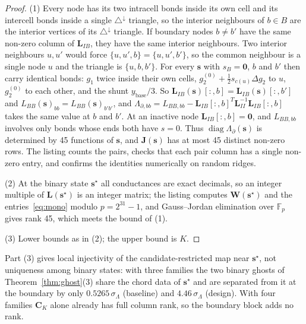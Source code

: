 \documentclass[11pt,a4paper]{article}
\theoremstyle{definition}
\theoremstyle{remark}
\begin{document}
\begin{proof}
(1) Every node has its two intracell bonds inside its own cell and its intercell bonds inside a single $\triangle^{\downarrow}$ triangle, so the interior neighbours of $b\in B$ are the interior vertices of its $\triangle^{\downarrow}$ triangle. If boundary nodes $b\neq b'$ have the same non-zero column of $\mathbf{L}_{IB}$, they have the same interior neighbours. Two interior neighbours $u,u'$ would force $\{u,u',b\} = \{u,u',b'\}$, so the common neighbour is a single node $u$ and the triangle is $\{u,b,b'\}$. For every $\mathbf{s}$ with $s_B = \mathbf{0}$, $b$ and $b'$ then carry identical bonds: $g_1$ twice inside their own cells, $g_2^{(0)}+\tfrac12 s_{c(u)}\Delta g_2$ to $u$, $g_2^{(0)}$ to each other, and the shunt $y_{\text{base}}/3$. So $\mathbf{L}_{IB}(\mathbf{s})[:,b] = \mathbf{L}_{IB}(\mathbf{s})[:,b']$ and $L_{BB}(\mathbf{s})_{bb} = L_{BB}(\mathbf{s})_{b'b'}$, and $\Lambda_{\partial,bb} = L_{BB,bb} - \mathbf{L}_{IB}[:,b]^T\mathbf{L}_{II}^{-1}\mathbf{L}_{IB}[:,b]$ takes the same value at $b$ and $b'$. At an inactive node $\mathbf{L}_{IB}[:,b] = \mathbf{0}$, and $L_{BB,bb}$ involves only bonds whose ends both have $s = 0$. Thus $\operatorname{diag}\Lambda_\partial(\mathbf{s})$ is determined by 45 functions of $\mathbf{s}$, and $\mathbf{J}(\mathbf{s})$ has at most 45 distinct non-zero rows. The listing counts the pairs, checks that each pair column has a single non-zero entry, and confirms the identities numerically on random ridges.

(2) At the binary state $\mathbf{s}^\star$ all conductances are exact decimals, so an integer multiple of $\mathbf{L}(\mathbf{s}^\star)$ is an integer matrix; the listing computes $\mathbf{W}(\mathbf{s}^\star)$ and the entries~\eqref{eq:mono} modulo $p = 2^{31}-1$, and Gauss--Jordan elimination over $\mathbb{F}_p$ gives rank 45, which meets the bound of (1).

(3) Lower bounds as in (2); the upper bound is $K$.
\end{proof}
Part (3) gives local injectivity of the candidate-restricted map near $\mathbf{s}^\star$, not uniqueness among binary states: with three families the two binary ghosts of Theorem~\ref{thm:ghost}(3) share the chord data of $\mathbf{s}^\star$ and are separated from it at the boundary by only $0.5265\,\sigma_\Lambda$ (baseline) and $4.46\,\sigma_\Lambda$ (design). With four families $\mathbf{C}_K$ alone already has full column rank, so the boundary block adds no rank.
\end{document}
